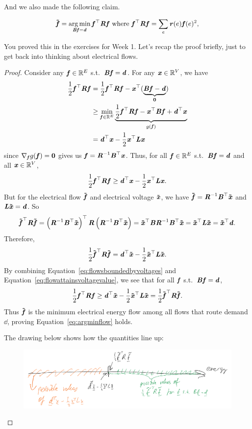 And we also made the following claim.
\begin{claim}
  \begin{equation}
    \label{eq:argminflow}
    \fftil = \argmin_{\BB\ff=\dd} \ff^\trp\RR\ff \text{ where }
    \ff^\trp\RR\ff=\sum_e \rr(e)\ff(e)^2,
  \end{equation}
\end{claim}
You proved this in the exercises for Week 1. Let's recap the proof
briefly, just to get back into thinking about electrical flows.
\begin{proof}
Consider any $\ff\in\R^E$ s.t.\ $\BB\ff=\dd$. For any $\xx\in\R^V$, we have
\begin{align*}
	\frac{1}{2}\ff^\trp\RR\ff
	&= \frac{1}{2}\ff^\trp\RR\ff  - \xx^\trp(\underbrace{\BB\ff-\dd}_{\matzero}) \\
	&\geq \min_{\ff\in\R^E} \underbrace{\frac{1}{2}\ff^\trp\RR\ff  - \xx^\trp\BB\ff + \dd^\trp\xx}_{g(\ff)}  \\
	&= \dd^\trp\xx - \frac{1}{2}\xx^\trp\LL\xx
\end{align*}
since $\nabla_{\ff}g(\ff) = \matzero$ gives us $\ff=\RR^{-1}\BB^\trp\xx$. Thus, for all $\ff\in\R^E$ s.t.\ $\BB\ff=\dd$ and all $\xx\in\R^V$,
\begin{equation}
  \label{eq:flowsboundedbyvoltages}
\frac{1}{2}\ff^\trp\RR\ff \geq \dd^\trp\xx -
  \frac{1}{2}\xx^\trp\LL\xx.
\end{equation}
But for the electrical flow $\fftil$ and electrical voltage $\xxtil$, we have $\fftil=\RR^{-1}\BB^\trp\xxtil$ and $\LL\xxtil=\dd$. So
\[ \fftil^\trp\RR\fftil = \left(\RR^{-1}\BB^\trp\xxtil\right)^\trp\RR\left(\RR^{-1}\BB^\trp\xxtil\right) = \xxtil^\trp\BB\RR^{-1}\BB^\trp\xxtil = \xxtil^\trp\LL\xxtil  =\xxtil^\trp\dd. \]
Therefore,
\begin{equation}
   \label{eq:flowattainsvoltagevalue}
\frac{1}{2}\fftil^\trp\RR\fftil = \dd^\trp\xxtil -
\frac{1}{2}\xxtil^\trp\LL\xxtil.
\end{equation}
 By combining Equation~\eqref{eq:flowsboundedbyvoltages} and
 Equation~\eqref{eq:flowattainsvoltagevalue}, we see that for all
 $\ff$ s.t.\ $\BB \ff = \dd$,
 \[
 \frac{1}{2}\ff^\trp\RR\ff \geq \dd^\trp\xxtil -
\frac{1}{2}\xxtil^\trp\LL\xxtil = \frac{1}{2}\fftil^\trp\RR\fftil.
\]
Thus $\fftil$ is the minimum electrical energy flow among all flows
that route demand $\dd$, proving Equation~\eqref{eq:argminflow} holds.

The drawing below shows how the quantities line up:
\begin{figure}[H]
  \centering
     \includegraphics[width=\textwidth]{fig/lecture6_maxminfig.jpeg}
\label{fig:regions}
\end{figure}
\end{proof}



